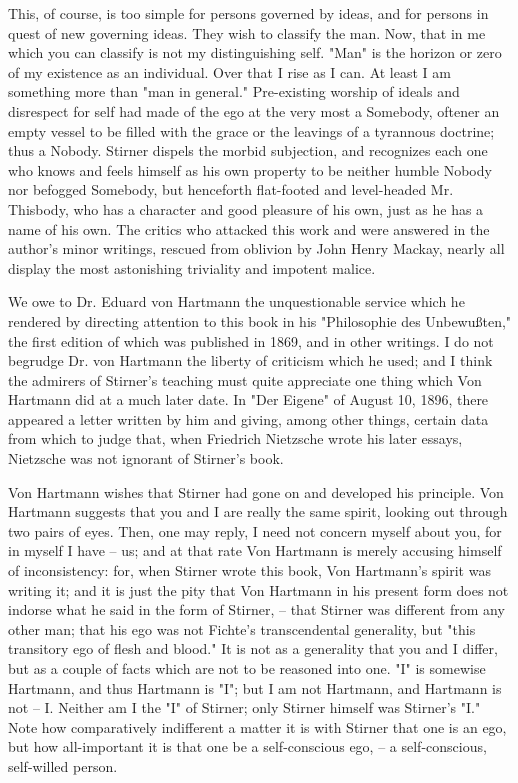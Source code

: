 \documentclass[a4paper]{book}
\begin{document}
This, of course, is too simple for persons governed by ideas, and for persons 
in quest of new governing ideas. They wish to classify the man. Now, that in 
me which you can classify is not my distinguishing self. "{}Man"{} is the 
horizon or zero of my existence as an individual. Over that I rise as I can. 
At least I am something more than "{}man in general."{} Pre-existing worship 
of ideals and disrespect for self had made of the ego at the very most a 
Somebody, oftener an empty vessel to be filled with the grace or the leavings 
of a tyrannous doctrine; thus a Nobody. Stirner dispels the morbid subjection, 
and recognizes each one who knows and feels himself as his own property to be 
neither humble Nobody nor befogged Somebody, but henceforth flat-footed and 
level-headed Mr. Thisbody, who has a character and good pleasure of his own, 
just as he has a name of his own. The critics who attacked this work and were 
answered in the author's minor writings, rescued from oblivion by John Henry 
Mackay, nearly all display the most astonishing triviality and impotent 
malice.

We owe to Dr. Eduard von Hartmann the unquestionable service which he rendered 
by directing attention to this book in his "{}Philosophie des 
Unbewu\ss{}ten,"{} the first edition of which was published in 1869, and in 
other writings. I do not begrudge Dr. von Hartmann the liberty of criticism 
which he used; and I think the admirers of Stirner's teaching must quite 
appreciate one thing which Von Hartmann did at a much later date. In "{}Der 
Eigene"{} of August 10, 1896, there appeared a letter written by him and 
giving, among other things, certain data from which to judge that, when 
Friedrich Nietzsche wrote his later essays, Nietzsche was not ignorant of 
Stirner's book.

Von Hartmann wishes that Stirner had gone on and developed his principle. Von 
Hartmann suggests that you and I are really the same spirit, looking out 
through two pairs of eyes. Then, one may reply, I need not concern myself 
about you, for in myself I have -- us; and at that rate Von Hartmann is merely 
accusing himself of inconsistency: for, when Stirner wrote this book, Von 
Hartmann's spirit was writing it; and it is just the pity that Von Hartmann in 
his present form does not indorse what he said in the form of Stirner, -- that 
Stirner was different from any other man; that his ego was not Fichte's 
transcendental generality, but "{}this transitory ego of flesh and blood."{} 
It is not as a generality that you and I differ, but as a couple of facts 
which are not to be reasoned into one. "{}I"{} is somewise Hartmann, and thus 
Hartmann is "{}I"{}; but I am not Hartmann, and Hartmann is not -- I. Neither 
am I the "{}I"{} of Stirner; only Stirner himself was Stirner's "{}I."{} Note 
how comparatively indifferent a matter it is with Stirner that one is an ego, 
but how all-important it is that one be a self-conscious ego, -- a 
self-conscious, self-willed person.
\end{document}
